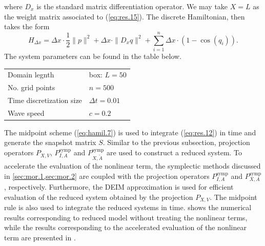 where $D_x$ is the standard matrix differentiation operator. We may take $X = L$ as the weight matrix associated to (\ref{eq:res.15}). The discrete Hamiltonian, then takes the form
\begin{equation} \label{eq:res.17}
	H_{\Delta x} = \Delta x \cdot \frac 1 2 \| p \|^2 + \Delta x \cdot \| D_x q \|^2 + \sum_{i=1}^{n} \Delta x \cdot ( 1 - \cos(q_i) ).
\end{equation}
The system parameters can be found in the table below.
\vspace{0.5cm}
\begin{center}
\begin{tabular}{|l|l|}
\hline
Domain legnth & box: $L = 50$ \\
No. grid points & $n = 500$ \\
Time discretization size & $\Delta t = 0.01$ \\
Wave speed & $c=0.2$ \\
\hline
\end{tabular}
\end{center}
\vspace{0.5cm}

The midpoint scheme (\ref{eq:hamil.7}) is used to integrate (\ref{eq:res.12}) in time and generate the snapshot matrix $S$. Similar to the previous subsection, projection operators $P_{X,V}$, $P^{\text{symp}}_{I,A}$ and $P^{\text{symp}}_{X,\tilde A}$ are used to construct a reduced system. To accelerate the evaluation of the nonlinear term, the symplectic methods discussed in \cref{sec:mor.1,sec:mor.2} are coupled with the projection operators $P^{\text{symp}}_{I,A}$ and $P^{\text{symp}}_{X,A}$, respectively. Furthermore, the DEIM approximation is used for efficient evaluation of the reduced system obtained by the projection $P_{X,V}$. The midpoint rule is also used to integrate the reduced systems in time.  shows the numerical results corresponding to reduced model without treating the nonlinear terms, while the results corresponding to the accelerated evaluation of the nonlinear term are presented in .

